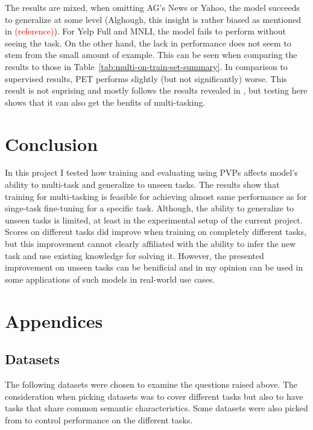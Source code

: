 \documentclass[11pt,a4paper]{article}
\newcommand\todo[1]{\textcolor{red}{#1}}
\begin{document}
The results are mixed, when omitting AG's News or Yahoo, the model succeeds to generalize at some level (Alghough, this insight is rather biased as mentioned in \todo{(reference)}).
For Yelp Full and MNLI, the model fails to perform without seeing the task.
On the other hand, the lack in performance does not seem to stem from the small amount of example.
This can be seen when comparing the results to those in Table~\ref{tab:multi-on-train-set-summary}.
In comparison to supervised results, PET performs slightly (but not significantly) worse.
This result is not suprising and mostly follows the results revealed in \citet{schick2020exploiting}, but testing here shows that it can also get the benfits of multi-tasking.

\section{Conclusion}
In this project I tested how training and evaluating using PVPs affects model's ability to multi-task and generalize to unseen tasks.
The results show that training for multi-tasking is feasible for achieving almost same performance as for singe-task fine-tuning for a specific task.
Although, the ability to generalize to unseen tasks is limited, at least in the experimental setup of the current project.
Scores on different tasks did improve when training on completely different tasks, but this improvement cannot clearly affiliated with the ability to infer the new task and use existing knowledge for solving it. 
However, the presented improvement on unseen tasks can be benificial and in my opinion can be used in some applications of such models in real-world use cases. 




\clearpage
\appendix


\section{Appendices}
\label{sec:appendix}

\subsection{Datasets}
\label{apx:datasets}
The following datasets were chosen to examine the questions raised above.
The consideration when picking datasets was to cover different tasks but also to have tasks that share common semantic characteristics. 
Some datasets were also picked from \citet{schick2020exploiting} to control performance on the different tasks.
\end{document}

